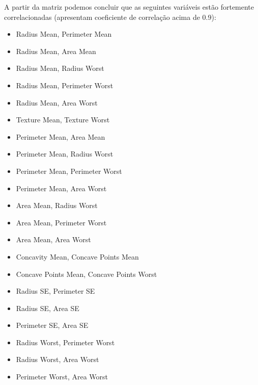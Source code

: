 \documentclass[11pt,a4paper]{article}
\numberwithin{equation}{section}
\begin{document}
A partir da matriz podemos concluir que as seguintes variáveis estão fortemente correlacionadas (apresentam coeficiente de correlação acima de 0.9):
\begin{itemize}
	 \item Radius Mean, Perimeter Mean
	 \item Radius Mean, Area Mean
	 \item Radius Mean, Radius Worst
	 \item Radius Mean, Perimeter Worst
	 \item Radius Mean, Area Worst
	 \item Texture Mean, Texture Worst
	 \item Perimeter Mean, Area Mean
	 \item Perimeter Mean, Radius Worst
	 \item Perimeter Mean, Perimeter Worst
	 \item Perimeter Mean, Area Worst
	 \item Area Mean, Radius Worst
	 \item Area Mean, Perimeter Worst
	 \item Area Mean, Area Worst
	 \item Concavity Mean, Concave Points Mean
	 \item Concave Points Mean, Concave Points Worst
	 \item Radius SE, Perimeter SE
	 \item Radius SE, Area SE
	 \item Perimeter SE, Area SE
 	 \item Radius Worst, Perimeter Worst
	 \item Radius Worst, Area Worst
	 \item Perimeter Worst, Area Worst

\end{itemize}
\end{document}
